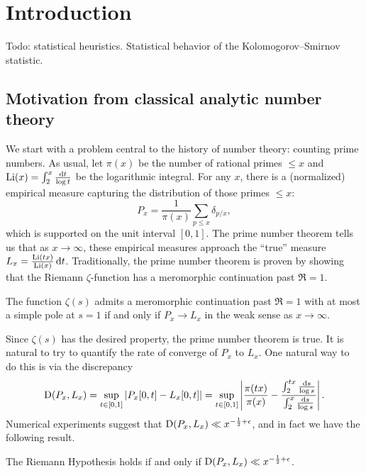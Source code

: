
\chapter{Introduction}

Todo: statistical heuristics. Statistical behavior of the 
Kolomogorov--Smirnov statistic. 





\section{Motivation from classical analytic number theory}

We start with a problem central to the history of number theory: counting 
prime numbers. As usual, let $\pi(x)$ be the number of rational primes 
$\leqslant x$ and $\operatorname{Li}(x) = \int_2^x \frac{\mathrm{d} t}{\log t}$ be the 
logarithmic integral. For any $x$, there is a (normalized) empirical measure 
capturing the distribution of those primes $\leqslant x$: 
\[
	P_x = \frac{1}{\pi(x)} \sum_{p\leqslant x} \delta_{p/x} ,
\]
which is supported on the unit interval $[0,1]$. The prime number theorem 
tells us that as $x\to \infty$, these empirical measures approach the 
``true'' measure $L_x = \frac{\operatorname{Li}(t x)}{\operatorname{Li}(x)}\, \mathrm{d} t$. Traditionally, the 
prime number theorem is proven by showing that the Riemann $\zeta$-function 
has a meromorphic continuation past $\Re =1$. 

\begin{theorem}
The function $\zeta(s)$ admits a meromorphic continuation past $\Re =1$ with 
at most a simple pole at $s=1$ if and only if $P_x \to L_x$ in the weak sense 
as $x\to \infty$. 
\end{theorem}

Since $\zeta(s)$ has the desired property, the prime number theorem is true. 
It is natural to try to quantify the rate of converge of $P_x$ to $L_x$. One 
natural way to do this is via the discrepancy 
\[
	\operatorname{D}(P_x,L_x) 
		= \sup_{t\in [0,1]} \left| P_x[0,t] - L_x[0,t]\right|
		= \sup_{t\in [0,1]} \left| \frac{\pi(t x)}{\pi(x)} - \frac{\int_2^{tx} \frac{\mathrm{d} s}{\log s}}{\int_2^x \frac{\mathrm{d} s}{\log s}}\right| .
\]
Numerical experiments suggest that 
$\operatorname{D}(P_x,L_x) \ll x^{-\frac 1 2+\epsilon}$, and in fact we have the following 
result. 

\begin{theorem}
The Riemann Hypothesis holds if and only if 
$\operatorname{D}(P_x,L_x) \ll x^{-\frac 1 2+\epsilon}$. 
\end{theorem}

